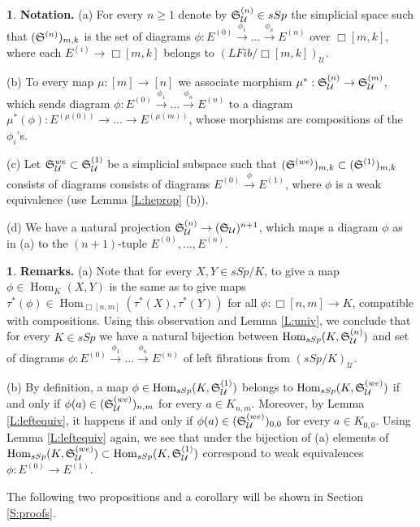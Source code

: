 \documentclass[12pt]{amsart}
\theoremstyle{plain}
\theoremstyle{definition}
\newtheorem{Emp}[Thm]{}
\numberwithin{equation}{section}
\newcommand{\cal}[1]{\mathcal{#1}}
\newcommand{\C}[1]{\cal#1}
\newcommand{\lra}{\longrightarrow}
\newcommand{\rs}[1]{Section \ref{S:#1}}
\newcommand{\rl}[1]{Lemma \ref{L:#1}}
\newcommand{\Hom}{\operatorname{Hom}}
\renewcommand{\S}{\frak{S}}
\begin{document}
\begin{Emp}
{\bf Notation.} (a) For every $n\geq 1$ denote by
$\S^{(n)}_{\C{U}}\in sSp$ the simplicial space such that
$(\S^{(n)})_{m,k}$ is the set of diagrams
$\phi:E^{(0)}\overset{\phi_1}{\lra} \ldots
\overset{\phi_n}{\lra}E^{(n)}$ over $\Box[m,k]$, where each
$E^{(i)}\to\Box[m,k]$ belongs to $(LFib/\Box[m,k])_{\C{U}}$.

(b) To every map $\mu:[m]\to[n]$ we associate morphism
$\mu^*:\S^{(n)}_{\C{U}}\to\S^{(m)}_{\C{U}}$, which sends diagram
$\phi:E^{(0)}\overset{\phi_1}{\lra} \ldots
\overset{\phi_n}{\lra}E^{(n)}$ to a diagram
$\mu^*(\phi):E^{(\mu(0))}\to \ldots\to E^{(\mu(m))}$, whose
morphisms are compositions of the $\phi_i$'s.

(c) Let $\S_{\C{U}}^{we}\subset \S^{(1)}_{\C{U}}$ be a simplicial
subspace such that $(\S^{(we)})_{m,k}\subset (\S^{(1)})_{m,k}$ consists of diagrams 
consists of diagrams $E^{(0)}\overset{\phi}{\lra} E^{(1)}$, where $\phi$ is a weak equivalence 
(use \rl{heprop} (b)).

(d) We have a natural projection $\S_{\C{U}}^{(n)}\to
(\S_{\C{U}})^{n+1}$, which maps a diagram $\phi$ as in (a) to the
$(n+1)$-tuple $E^{(0)},\ldots,E^{(n)}$.
\end{Emp}

\begin{Emp} \label{E:remsn}
{\bf Remarks.} (a) Note that for every $X,Y\in sSp/K$, to give a
map $\phi\in\Hom_K(X,Y)$ is the same as to give maps
$\tau^*(\phi)\in\Hom_{\Box[n,m]}(\tau^*(X),\tau^*(Y))$ for all
$\phi:\Box[n,m]\to K$, compatible with compositions. Using this observation 
and \rl{univ}, we conclude that for every $K\in sSp$ we have a natural
bijection between $\Hom_{sSp}(K,\S_{\C{U}}^{(n)})$ and set of
diagrams $\phi:E^{(0)}\overset{\phi_1}{\lra} \ldots
\overset{\phi_n}{\lra}E^{(n)}$ of left fibrations from
$(sSp/K)_{\C{U}}$.

(b) By definition, a map $\phi\in\Hom_{sSp}(K,\S_{\C{U}}^{(1)})$
belongs to $\Hom_{sSp}(K,\S_{\C{U}}^{(we)})$ if and only if
$\phi(a)\in (\S_{\C{U}}^{(we)})_{n,m}$ for every $a\in K_{n,m}$.
Moreover, by \rl{leftequiv}, it happens if and only if $\phi(a)\in
(\S_{\C{U}}^{(we)})_{0,0}$ for every $a\in K_{0,0}$. Using \rl{leftequiv} again, 
we see that under the bijection of (a) elements of
$\Hom_{sSp}(K,\S_{\C{U}}^{(we)})\subset\Hom_{sSp}(K,\S_{\C{U}}^{(1)})$
correspond to weak equivalences $\phi:E^{(0)}\to E^{(1)}$.
\end{Emp}

The following two propositions and a corollary will be shown in
\rs{proofs}.
\end{document}
